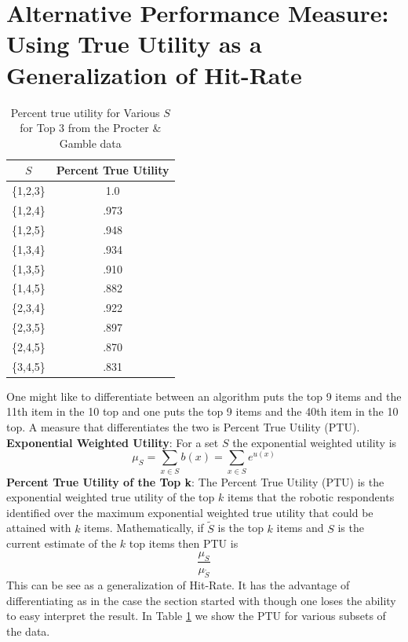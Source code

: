 \documentclass[a4paper,12pt]{article}
\begin{document}
\section{Alternative Performance Measure: Using True Utility as a Generalization of Hit-Rate}
\begin{table}
\begin{center}
\begin{tabular}{c | c }
$S$& Percent True Utility \\
\hline
\{1,2,3\}& 1.0 \\
\{1,2,4\}&.973 \\
\{1,2,5\}&.948 \\
\{1,3,4\}&.934 \\
\{1,3,5\}&.910 \\
\{1,4,5\}&.882 \\
\{2,3,4\}&.922 \\
\{2,3,5\}&.897 \\
\{2,4,5\}&.870 \\
\{3,4,5\}&.831 \\
\hline
\end{tabular}
\end{center}
\caption{Percent true utility for Various $S$ for Top 3 from the Procter \& Gamble data}
\label{table:PTU}
\end{table}
One might like to differentiate between an algorithm puts the top 9 items and the 11th item in the 10 top and one puts the top 9 items and the 40th item in the 10 top. A measure that differentiates the two is Percent True Utility (PTU). \\
\textbf{Exponential Weighted Utility}: For a set $S$ the exponential weighted utility is \[\mu_S=\sum_{x \in S}b(x)=\sum_{x \in S}e^{u(x)}\]
\textbf{Percent True Utility of the Top k}: The Percent True Utility (PTU) is the exponential weighted true utility of the top $k$ items that the robotic respondents identified over the maximum exponential weighted true utility that could be attained with $k$ items. Mathematically, if $\tilde{S}$ is the top $k$ items and $S$ is the current estimate of the $k$ top items then PTU is 
\[
\frac{\mu_S}{\mu_{\tilde{S}}}
\]
This can be see as a generalization of Hit-Rate. It has the advantage of differentiating as in the case the section started with though one loses the ability to easy interpret the result. In Table \ref{table:PTU} we show the PTU for various subsets of the data.
\end{document}
